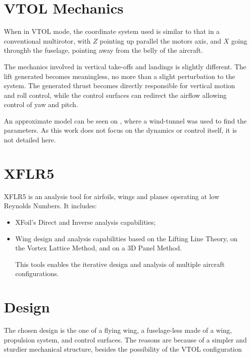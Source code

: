 \section{VTOL Mechanics}

When in VTOL mode, the coordinate system used is similar to that in a conventional multirotor, with $Z$ pointing up parallel the motors axis, and $X$ going throughb the fuselage, pointing away from the belly of the aircraft.

The mechanics involved in vertical take-offs and landings is slightly different. The lift generated becomes meaningless, no more than a slight perturbation to the system. The generated thrust becomes directly responsible for vertical motion and roll control, while the control surfaces can redirect the airflow allowing control of yaw and pitch.

An approximate model can be seen on \cite{7487466}, where a wind-tunnel was used to find the parameters. As this work does not focus on the dynamics or control itself, it is not detailed here.


\section{XFLR5}

XFLR5 is an analysis tool for airfoils, wings and planes operating at low Reynolds Numbers. It includes:
\begin{itemize}

\item XFoil's Direct and Inverse analysis capabilities;
\item Wing design and analysis capabilities based on the Lifting Line Theory, on the Vortex Lattice Method, and on a 3D Panel Method.

This tools enables the iterative design and analysis of multiple aircraft configurations.


\end{itemize}


\section{Design}

The chosen design is the one of a flying wing, a fuselage-less made of a wing, propulsion system, and control surfaces. The reasons are because of a simpler and sturdier mechanical structure, besides the possibility of the VTOL configuration

